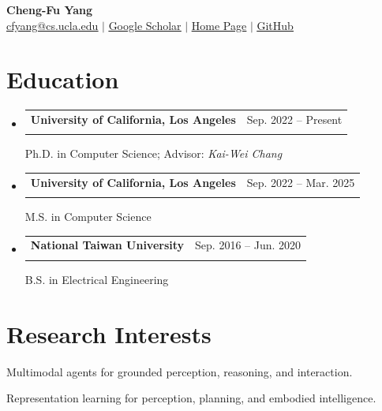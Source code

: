 \documentclass[letterpaper,11pt]{article}
\makeatletter
\newcommand{\resumeSubheading}[4]{
  \vspace{-2pt}\item
    \begin{tabular*}{0.97\textwidth}[t]{l@{\extracolsep{\fill}}r}
      \textbf{#1} & #2 \\
      \textit{\small#3} & \textit{\small #4} \\
    \end{tabular*}\vspace{-7pt}
}
\newcommand{\resumeSubHeadingListStart}{\begin{itemize}[leftmargin=0.15in, label={}]}
\newcommand{\resumeSubHeadingListEnd}{\end{itemize}}
\makeatother
\begin{document}
\begin{center}
    \Large\textbf{Cheng-Fu Yang} \\ 
    \vspace{1pt}
    \small \href{mailto:cfyang@cs.ucla.edu}{\underline{cfyang@cs.ucla.edu}} $|$ 
    \href{https://scholar.google.com.tw/citations?user=cJ5oowQAAAAJ}{\underline{Google Scholar}} $|$
    \href{https://joeyy5588.github.io/chengfu-yang/}{\underline{Home Page}} $|$
    \href{https://github.com/joeyy5588}{\underline{GitHub}}
\end{center}
\section{Education}
  \resumeSubHeadingListStart
    \resumeSubheading
      {University of California, Los Angeles}{Sep. 2022 -- Present}{}{}
      \vspace{-8pt}
      Ph.D. in Computer Science; Advisor: \textit{Kai-Wei Chang}

    \resumeSubheading
      {University of California, Los Angeles}{Sep. 2022 -- Mar. 2025}{}{}
      \vspace{-8pt}
      M.S. in Computer Science

    \resumeSubheading
      {National Taiwan University}{Sep. 2016 -- Jun. 2020}{}{}
      \vspace{-8pt}
      B.S. in Electrical Engineering
  \resumeSubHeadingListEnd

\section{Research Interests}

\hspace*{0.15in} Multimodal agents for grounded perception, reasoning, and interaction.
\vspace{4pt}

\hspace*{0.15in} Representation learning for perception, planning, and embodied intelligence.
\end{document}
